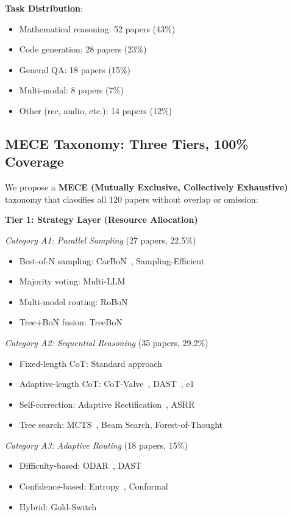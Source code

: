 \documentclass[10pt,preprint]{neurips_2024}
\begin{document}
\textbf{Task Distribution}:
\begin{itemize}
    \item Mathematical reasoning: 52 papers (43\%)
    \item Code generation: 28 papers (23\%)
    \item General QA: 18 papers (15\%)
    \item Multi-modal: 8 papers (7\%)
    \item Other (rec, audio, etc.): 14 papers (12\%)
\end{itemize}

\subsection{MECE Taxonomy: Three Tiers, 100\% Coverage}

We propose a \textbf{MECE (Mutually Exclusive, Collectively Exhaustive)} taxonomy that classifies all 120 papers without overlap or omission:

\textbf{Tier 1: Strategy Layer (Resource Allocation)}

\textit{Category A1: Parallel Sampling} (27 papers, 22.5\%)
\begin{itemize}
    \item Best-of-N sampling: CarBoN~\cite{carbon2024}, Sampling-Efficient~\cite{efficient2024}
    \item Majority voting: Multi-LLM~\cite{multi2024}
    \item Multi-model routing: RoBoN~\cite{robon2024}
    \item Tree+BoN fusion: TreeBoN~\cite{treebon2024}
\end{itemize}

\textit{Category A2: Sequential Reasoning} (35 papers, 29.2\%)
\begin{itemize}
    \item Fixed-length CoT: Standard approach
    \item Adaptive-length CoT: CoT-Valve~\cite{cotvalve2024}, DAST~\cite{dast2024}, e1~\cite{e12024}
    \item Self-correction: Adaptive Rectification~\cite{rect2024}, ASRR~\cite{asrr2024}
    \item Tree search: MCTS~\cite{mcts2024}, Beam Search, Forest-of-Thought~\cite{forest2024}
\end{itemize}

\textit{Category A3: Adaptive Routing} (18 papers, 15\%)
\begin{itemize}
    \item Difficulty-based: ODAR~\cite{odar2024}, DAST~\cite{dast2024}
    \item Confidence-based: Entropy~\cite{entropy2024}, Conformal~\cite{conformal2024}
    \item Hybrid: Gold-Switch~\cite{gold2024}
\end{itemize}
\end{document}
